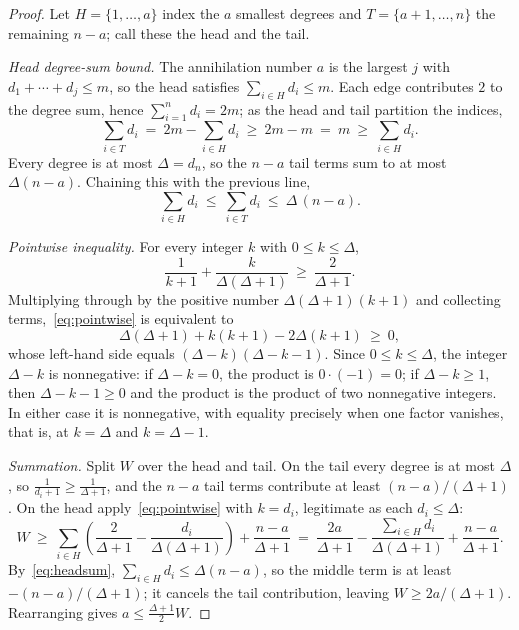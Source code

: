\documentclass[11pt]{article}
\theoremstyle{remark}
\begin{document}
\begin{proof}
Let $H = \{1, \ldots, a\}$ index the $a$ smallest degrees and
$T = \{a+1, \ldots, n\}$ the remaining $n-a$; call these the head and the tail.

\medskip\noindent\emph{Head degree-sum bound.}
The annihilation number $a$ is the largest $j$ with $d_1 + \cdots + d_j \le m$, so
the head satisfies $\sum_{i \in H} d_i \le m$. Each edge contributes $2$ to the
degree sum, hence $\sum_{i=1}^{n} d_i = 2m$; as the head and tail partition the
indices,
\[
  \sum_{i \in T} d_i \ =\ 2m - \sum_{i \in H} d_i \ \ge\ 2m - m \ =\ m
    \ \ge\ \sum_{i \in H} d_i .
\]
Every degree is at most $\Delta = d_n$, so the $n-a$ tail terms sum to at most
$\Delta(n-a)$. Chaining this with the previous line,
\begin{equation}\label{eq:headsum}
  \sum_{i \in H} d_i \ \le\ \sum_{i \in T} d_i \ \le\ \Delta\,(n-a).
\end{equation}

\medskip\noindent\emph{Pointwise inequality.}
For every integer $k$ with $0 \le k \le \Delta$,
\begin{equation}\label{eq:pointwise}
  \frac{1}{k+1} + \frac{k}{\Delta(\Delta+1)} \ \ge\ \frac{2}{\Delta+1}.
\end{equation}
Multiplying through by the positive number $\Delta(\Delta+1)(k+1)$ and collecting
terms,~\eqref{eq:pointwise} is equivalent to
\[
  \Delta(\Delta+1) + k(k+1) - 2\Delta(k+1) \ \ge\ 0,
\]
whose left-hand side equals $(\Delta-k)(\Delta-k-1)$. Since $0 \le k \le \Delta$,
the integer $\Delta - k$ is nonnegative: if $\Delta - k = 0$, the product is
$0 \cdot (-1) = 0$; if $\Delta - k \ge 1$, then $\Delta - k - 1 \ge 0$ and the
product is the product of two nonnegative integers. In either case it is
nonnegative, with equality precisely when one factor vanishes, that is, at
$k = \Delta$ and $k = \Delta - 1$.

\medskip\noindent\emph{Summation.}
Split $W$ over the head and tail. On the tail every degree is at most $\Delta$, so
$\tfrac{1}{d_i+1} \ge \tfrac{1}{\Delta+1}$, and the $n-a$ tail terms contribute at
least $(n-a)/(\Delta+1)$. On the head apply~\eqref{eq:pointwise} with $k = d_i$,
legitimate as each $d_i \le \Delta$:
\[
  W \ \ge\ \sum_{i \in H}\!\left(\frac{2}{\Delta+1} - \frac{d_i}{\Delta(\Delta+1)}\right)
        + \frac{n-a}{\Delta+1}
    \ =\ \frac{2a}{\Delta+1}
        - \frac{\sum_{i \in H} d_i}{\Delta(\Delta+1)}
        + \frac{n-a}{\Delta+1}.
\]
By~\eqref{eq:headsum}, $\sum_{i \in H} d_i \le \Delta(n-a)$, so the middle term is
at least $-(n-a)/(\Delta+1)$; it cancels the tail contribution, leaving
$W \ge 2a/(\Delta+1)$. Rearranging gives $a \le \tfrac{\Delta+1}{2}W$.
\end{proof}
\end{document}
